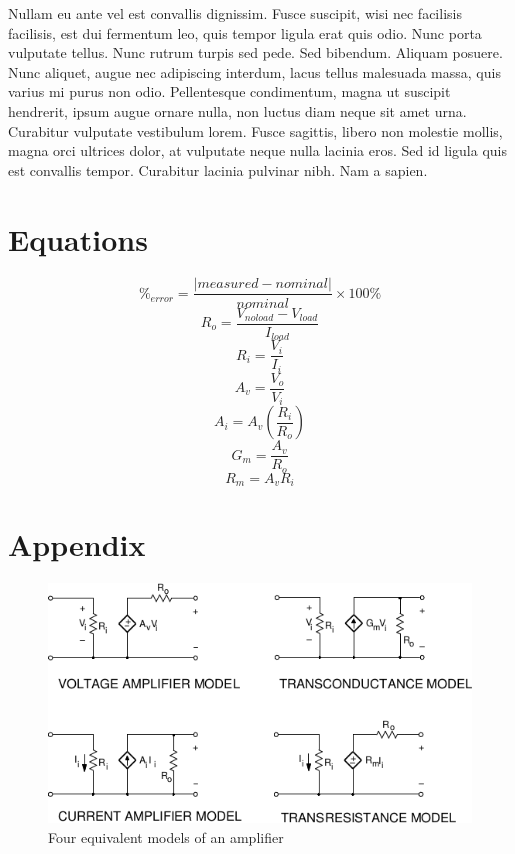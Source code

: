 \documentclass{article}
\begin{document}
Nullam eu ante vel est convallis dignissim. Fusce suscipit, wisi nec
facilisis facilisis, est dui fermentum leo, quis tempor ligula erat
quis odio. Nunc porta vulputate tellus. Nunc rutrum turpis sed
pede. Sed bibendum. Aliquam posuere. Nunc aliquet, augue nec
adipiscing interdum, lacus tellus malesuada massa, quis varius mi
purus non odio. Pellentesque condimentum, magna ut suscipit hendrerit,
ipsum augue ornare nulla, non luctus diam neque sit amet
urna. Curabitur vulputate vestibulum lorem. Fusce sagittis, libero non
molestie mollis, magna orci ultrices dolor, at vulputate neque nulla
lacinia eros. Sed id ligula quis est convallis tempor. Curabitur
lacinia pulvinar nibh. Nam a sapien.

\section*{Equations}

\begin{equation}
  \label{eqn:percent_error}
  \%_{error} = \frac{|measured - nominal|}{nominal} \times 100\%
\end{equation}
%
\begin{equation}
  \label{eqn:R_o}
  R_o = \frac{V_{noload} - V_{load}}{I_{load}}
\end{equation}
%
\begin{equation}
  \label{eqn:R_i}
  R_i = \frac{V_i}{I_i}
\end{equation}
%
\begin{equation}
  \label{eqn:A_v}
  A_v = \frac{V_o}{V_i}
\end{equation}
%
\begin{equation}
  \label{eqn:A_i}
  A_i = A_v \left(\frac{R_i}{R_o}\right)
\end{equation}
%
\begin{equation}
  \label{eqn:G_m}
  G_m = \frac{A_v}{R_o}
\end{equation}
%
\begin{equation}
  \label{eqn:R_m}
  R_m = A_v R_i
\end{equation}

\section{Appendix}
\label{sec:appendix}

\begin{figure}[h]
  \centering
  \includegraphics[]{img/amp_models}
  \caption{Four equivalent models of an amplifier}
  \label{fig:amp_models}
\end{figure}
\end{document}
